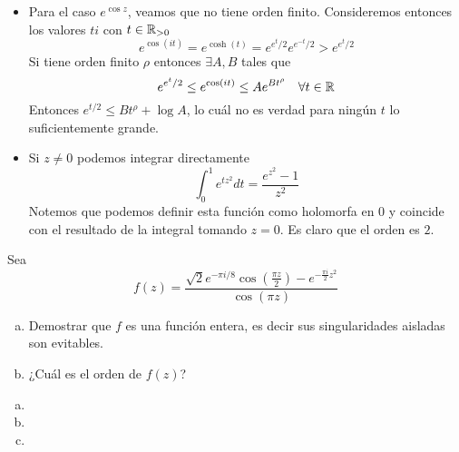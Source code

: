 \documentclass[twoside]{article}
\begin{document}
\begin{solucion}
\begin{itemize}
\item Para el caso $e^{\cos z}$, veamos que no tiene orden finito. Consideremos entonces los valores $ti$ con $t\in \mathbb{R}_{>0}$
$$
e^{\cos(it)}=e^{\cosh(t)}=e^{e^t/2}e^{e^{-t}/2} > e^{e^t/2}
$$
Si tiene orden finito $\rho$ entonces $\exists A, B$ tales que
$$
e^{e^t/2} \leq e^{\cos(it)} \leq Ae^{Bt^\rho} \quad \forall t\in \mathbb{R}$$
Entonces $e^{t/2}\leq Bt^\rho+\log A$, lo cuál no es verdad para ningún $t$ lo suficientemente grande.
\item Si $z\neq 0$ podemos integrar directamente
$$
\int_0^1 e^{tz^2}dt = \frac{e^{z^2}-1}{z^2}
$$
Notemos que podemos definir esta función como holomorfa en $0$ y coincide con el resultado de la integral tomando $z=0$. Es claro que el orden es $2$.
\end{itemize}

\end{solucion}

\newpage

\begin{ejercicio}{2}
Sea
$$
f(z)=\frac{\sqrt{2}e^{-\pi i/8}\cos\left(\frac{\pi z}{2}\right)-e^{-\frac{\pi i}{2}z^2}}{\cos(\pi z)}
$$
\begin{enumerate}[(a)]
\item Demostrar que $f$ es una función entera, es decir sus singularidades aisladas son evitables.
\item ¿Cuál es el orden de $f(z)$?
\end{enumerate}
\end{ejercicio}
\begin{solucion}
\begin{enumerate}[(a)]
\item[]
\item 
\item 
\end{enumerate}
\end{solucion}

\newpage
\end{document}
